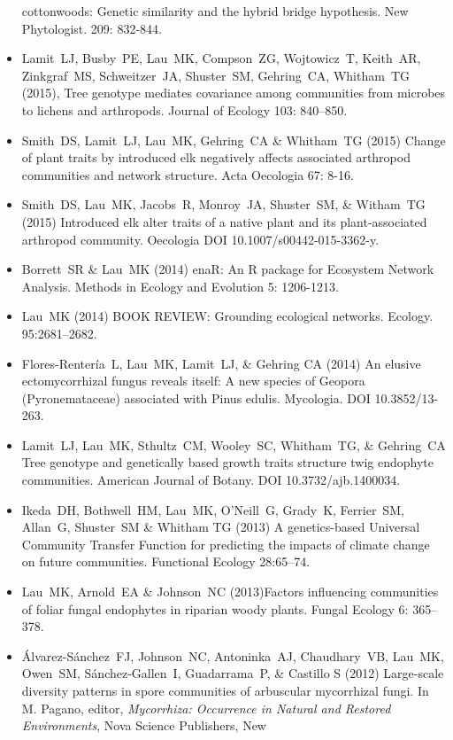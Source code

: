 \documentclass[a4paper]{article}
\begin{document}
\begin{itemize}
  cottonwoods: Genetic similarity and the hybrid bridge
  hypothesis. New Phytologist. 209: 832-844.
\item 
  Lamit~LJ, Busby~PE, Lau~MK, Compson~ZG, Wojtowicz~T, Keith~AR,
  Zinkgraf~MS, Schweitzer~JA, Shuster~SM, Gehring~CA, Whitham~TG
  (2015), Tree genotype mediates covariance among communities from
  microbes to lichens and arthropods. Journal of Ecology 103: 840–850.
\item
  Smith~DS, Lamit~LJ, Lau~MK, Gehring~CA \& Whitham~TG (2015) Change
  of plant traits by introduced elk negatively affects associated
  arthropod communities and network structure. Acta Oecologia 67: 8-16. 
\item 
  Smith~DS, Lau~MK, Jacobs~R, Monroy~JA, Shuster~SM, \& Witham~TG (2015)
  Introduced elk alter traits of a native plant and its plant-associated
  arthropod community. Oecologia DOI 10.1007/s00442-015-3362-y.
\item
  Borrett~SR \& Lau~MK (2014) enaR: An R package for Ecosystem Network
  Analysis. Methods in Ecology and Evolution 5: 1206-1213.
\item
  Lau~MK (2014) BOOK REVIEW: Grounding ecological networks. Ecology.
  95:2681--2682.
\item
  Flores-Rentería~L, Lau~MK, Lamit~LJ, \& Gehring CA (2014) An elusive
  ectomycorrhizal fungus reveals itself: A new species of Geopora
  (Pyronemataceae) associated with Pinus edulis. Mycologia. DOI
  10.3852/13-263.
\item
  Lamit~LJ, Lau~MK, Sthultz~CM, Wooley~SC, Whitham~TG, \& Gehring~CA
  Tree genotype and genetically based growth traits structure twig
  endophyte communities. American Journal of Botany. DOI 10.3732/ajb.1400034.
\item
  Ikeda~DH, Bothwell~HM, Lau~MK, O'Neill~G, Grady~K, Ferrier~SM,
  Allan~G, Shuster~SM \& Whitham TG (2013) A genetics-based Universal
  Community Transfer Function for predicting the impacts of climate
  change on future communities. Functional Ecology 28:65--74.
\item
  Lau~MK, Arnold~EA \& Johnson~NC (2013)Factors influencing communities
  of foliar fungal endophytes in riparian woody plants. Fungal Ecology
  6: 365--378.
\item
  Álvarez-Sánchez~FJ, Johnson~NC, Antoninka~AJ, Chaudhary~VB, Lau~MK,
  Owen~SM, Sánchez-Gallen~I, Guadarrama~P, \& Castillo S (2012)
  Large-scale diversity patterns in spore communities of arbuscular
  mycorrhizal fungi. In M. Pagano, editor, \emph{Mycorrhiza: Occurrence
  in Natural and Restored Environments}, Nova Science Publishers, New

\end{itemize}
\end{document}
